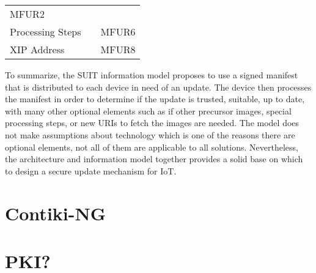 \documentclass[0-thesis.tex]{subfiles}
\begin{document}
\begin{longtable}[]{@{}lll@{}}
\begin{minipage}[t]{0.23\columnwidth}
    MFUR2\strut
    \end{minipage}\tabularnewline
    \begin{minipage}[t]{0.32\columnwidth}\raggedright\strut
    Processing Steps\strut
    \end{minipage} & \begin{minipage}[t]{0.36\columnwidth}\raggedright\strut
    \strut
    \end{minipage} & \begin{minipage}[t]{0.23\columnwidth}\raggedright\strut
    MFUR6\strut
    \end{minipage}\tabularnewline
    \begin{minipage}[t]{0.32\columnwidth}\raggedright\strut
    XIP Address\strut
    \end{minipage} & \begin{minipage}[t]{0.36\columnwidth}\raggedright\strut
    \strut
    \end{minipage} & \begin{minipage}[t]{0.23\columnwidth}\raggedright\strut
    MFUR8\strut
    \end{minipage}\tabularnewline
    \bottomrule
\end{longtable}

To summarize, the SUIT information model proposes to use a signed manifest that is distributed 
to each device in need of an update. The device then processes the manifest in order to determine 
if the update is trusted, suitable, up to date, with many other optional elements such as if 
other precursor images, special processing steps, or new URIs to fetch the images are needed. 
The model does not make assumptions about technology which is one of the reasons there are 
optional elements, not all of them are applicable to all solutions. Nevertheless, the architecture 
and information model together provides a solid base on which to design a secure update 
mechanism for IoT.

\section{Contiki-NG}

\section{PKI?}
\end{document}
